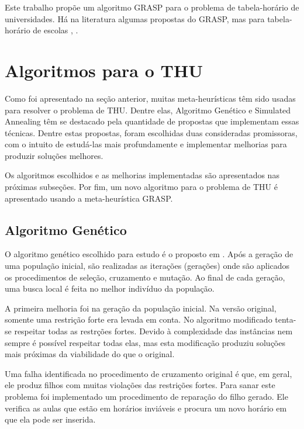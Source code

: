 \documentclass[11pt]{article}
\begin{document}
Este trabalho propõe um algoritmo GRASP para o problema de tabela-horário de universidades. Há na literatura algumas propostas do GRASP, mas para tabela-horário de escolas \cite{Souza:2004}, \cite{Vieira_agrasp}.



\section{Algoritmos para o THU}
\label{sec:algoritmos}

Como foi apresentado na seção anterior, muitas meta-heurísticas têm sido usadas para resolver o problema de THU. Dentre elas, Algoritmo Genético e Simulated Annealing têm se destacado pela quantidade de propostas que implementam essas técnicas. Dentre estas propostas, foram escolhidas duas consideradas promissoras, com o intuito de estudá-las mais profundamente e implementar melhorias para produzir soluções melhores.

Os algoritmos escolhidos e as melhorias implementadas são apresentados nas próximas subseções. Por fim, um novo algoritmo para o problema de THU é apresentado usando a meta-heurística GRASP.

\subsection{Algoritmo Genético}

O algoritmo genético escolhido para estudo é o proposto em \cite{massoodian2008}. Após a geração de uma população inicial, são realizadas as iterações (gerações) onde são aplicados os procedimentos de seleção, cruzamento e mutação. Ao final de cada geração, uma busca local é feita no melhor indivíduo da população.

A primeira melhoria foi na geração da população inicial. Na versão original, somente uma restrição forte era levada em conta. No algoritmo modificado tenta-se respeitar todas as restrções fortes. Devido à complexidade das instâncias nem sempre é possível respeitar todas elas, mas esta modificação produziu soluções mais próximas da viabilidade do que o original.

Uma falha identificada no procedimento de cruzamento original é que, em geral, ele produz filhos com muitas violações das restrições fortes. Para sanar este problema foi implementado um procedimento de reparação do filho gerado. Ele verifica as aulas que estão em horários inviáveis e procura um novo horário em que ela pode ser inserida.
\end{document}
